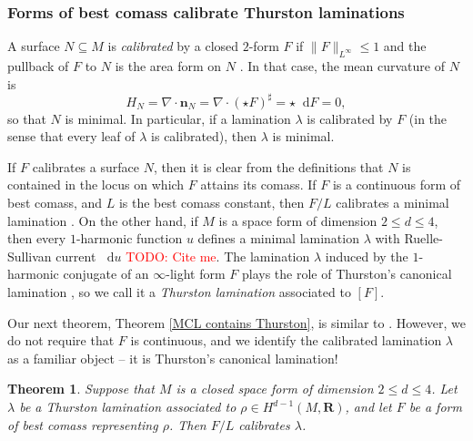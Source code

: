 \documentclass[reqno,11pt]{amsart}
\newcommand{\RR}{\mathbf{R}}
\newcommand*\dif{\mathop{}\!\mathrm{d}}
\newcommand{\normal}{\mathbf n}
\newcommand{\dfn}[1]{\emph{#1}\index{#1}}
\newtheorem{mainthm}{Theorem}
\theoremstyle{definition}
\numberwithin{equation}{section}
\newcommand\todo[1]{\textcolor{red}{TODO: #1}}
\begin{document}
\subsubsection{Forms of best comass calibrate Thurston laminations}
A surface $N \subseteq M$ is \dfn{calibrated} by a closed $2$-form $F$ if $\|F\|_{L^\infty} \leq 1$ and the pullback of $F$ to $N$ is the area form on $N$ \cite{Harvey82}.
In that case, the mean curvature of $N$ is 
\begin{equation}\label{calibrated surfaces are minimal}
H_N = \nabla \cdot \normal_N = \nabla \cdot (\star F)^\sharp = \star \dif F = 0,
\end{equation}
so that $N$ is minimal. 
In particular, if a lamination $\lambda$ is calibrated by $F$ (in the sense that every leaf of $\lambda$ is calibrated), then $\lambda$ is minimal.

If $F$ calibrates a surface $N$, then it is clear from the definitions that $N$ is contained in the locus on which $F$ attains its comass.
If $F$ is a continuous form of best comass, and $L$ is the best comass constant, then $F/L$ calibrates a minimal lamination \cite{bangert_cui_2017}.
On the other hand, if $M$ is a space form of dimension $2 \leq d \leq 4$, then every $1$-harmonic function $u$ defines a minimal lamination $\lambda$ with Ruelle-Sullivan current $\dif u$ \todo{Cite me}.
The lamination $\lambda$ induced by the $1$-harmonic conjugate of an $\infty$-light form $F$ plays the role of Thurston's canonical lamination \cite{Thurston98}, so we call it a \dfn{Thurston lamination} associated to $[F]$.

Our next theorem, Theorem \ref{MCL contains Thurston}, is similar to \cite[Theorem 5.1]{bangert_cui_2017}.
However, we do not require that $F$ is continuous, and we identify the calibrated lamination $\lambda$ as a familiar object -- it is Thurston's canonical lamination!

\begin{mainthm}
Suppose that $M$ is a closed space form of dimension $2 \leq d \leq 4$.
Let $\lambda$ be a Thurston lamination associated to $\rho \in H^{d - 1}(M, \RR)$, and let $F$ be a form of best comass representing $\rho$.
Then $F/L$ calibrates $\lambda$. 
\end{mainthm}

\end{document}
